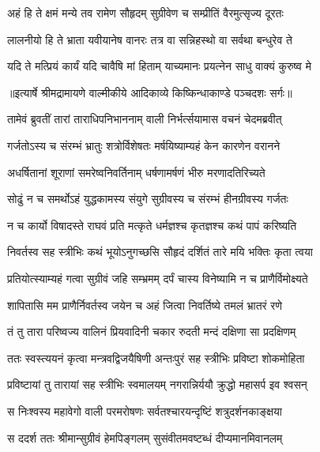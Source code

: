 \twolineshloka
{अहं हि ते क्षमं मन्ये तव रामेण सौहृदम्}
{सुग्रीवेण च सम्प्रीतिं वैरमुत्सृज्य दूरतः} %

\twolineshloka
{लालनीयो हि ते भ्राता यवीयानेष वानरः}
{तत्र वा सन्निहस्थो वा सर्वथा बन्धुरेव ते} %

\twolineshloka
{यदि ते मत्प्रियं कार्यं यदि चावैषि मां हिताम्}
{याच्यमानः प्रयत्नेन साधु वाक्यं कुरुष्व मे} %


{॥इत्यार्षे श्रीमद्रामायणे वाल्मीकीये आदिकाव्ये किष्किन्धाकाण्डे पञ्चदशः सर्गः॥}


\twolineshloka
{तामेवं ब्रुवतीं तारां ताराधिपनिभाननाम्}
{वाली निर्भर्त्सयामास वचनं चेदमब्रवीत्} %

\twolineshloka
{गर्जतोऽस्य च संरम्भं भ्रातुः शत्रोर्विशेषतः}
{मर्षयिष्याम्यहं केन कारणेन वरानने} %

\twolineshloka
{अधर्षितानां शूराणां समरेष्वनिवर्तिनाम्}
{धर्षणामर्षणं भीरु मरणादतिरिच्यते} %

\twolineshloka
{सोढुं न च समर्थोऽहं युद्धकामस्य संयुगे}
{सुग्रीवस्य च संरम्भं हीनग्रीवस्य गर्जतः} %

\twolineshloka
{न च कार्यो विषादस्ते राघवं प्रति मत्कृते}
{धर्मज्ञश्च कृतज्ञश्च कथं पापं करिष्यति} %

\twolineshloka
{निवर्तस्व सह स्त्रीभिः कथं भूयोऽनुगच्छसि}
{सौहृदं दर्शितं तारे मयि भक्तिः कृता त्वया} %

\twolineshloka
{प्रतियोत्स्याम्यहं गत्वा सुग्रीवं जहि सम्भ्रमम्}
{दर्पं चास्य विनेष्यामि न च प्राणैर्विमोक्ष्यते} %

\twolineshloka
{शापितासि मम प्राणैर्निवर्तस्व जयेन च}
{अहं जित्वा निवर्तिष्ये तमलं भ्रातरं रणे} %

\twolineshloka
{तं तु तारा परिष्वज्य वालिनं प्रियवादिनी}
{चकार रुदती मन्दं दक्षिणा सा प्रदक्षिणम्} %

\twolineshloka
{ततः स्वस्त्ययनं कृत्वा मन्त्रवद्विजयैषिणी}
{अन्तःपुरं सह स्त्रीभिः प्रविष्टा शोकमोहिता} %

\twolineshloka
{प्रविष्टायां तु तारायां सह स्त्रीभिः स्वमालयम्}
{नगरान्निर्ययौ क्रुद्धो महासर्प इव श्वसन्} %

\twolineshloka
{स निःश्वस्य महावेगो वाली परमरोषणः}
{सर्वतश्चारयन्दृष्टिं शत्रुदर्शनकाङ्क्षया} %

\twolineshloka
{स ददर्श ततः श्रीमान्सुग्रीवं हेमपिङ्गलम्}
{सुसंवीतमवष्टब्धं दीप्यमानमिवानलम्} %

